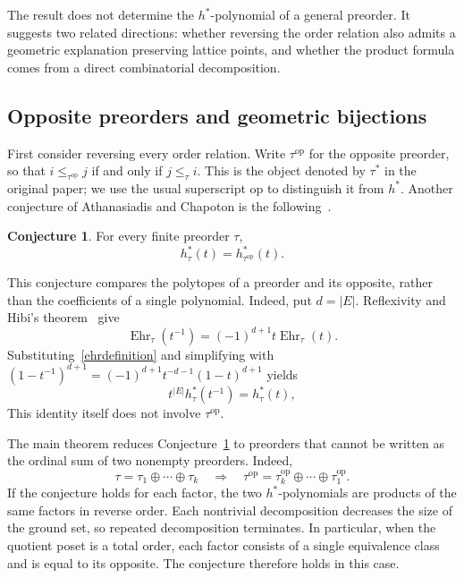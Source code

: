 \documentclass[11pt,reqno]{amsart}
\numberwithin{equation}{section}
\theoremstyle{definition}
\theoremstyle{remark}
\theoremstyle{definition}
\newtheorem{conjecture}[theorem]{Conjecture}
\DeclareMathOperator{\Ehr}{Ehr}
\begin{document}
The result does not determine the $h^*$-polynomial of a general preorder. It suggests two related directions: whether reversing the order relation also admits a geometric explanation preserving lattice points, and whether the product formula comes from a direct combinatorial decomposition.

\subsection{Opposite preorders and geometric bijections}
First consider reversing every order relation. Write $\tau^{\mathrm{op}}$ for the opposite preorder, so that $i\le_{\tau^{\mathrm{op}}}j$ if and only if $j\le_\tau i$. This is the object denoted by $\tau^*$ in the original paper; we use the usual superscript $\mathrm{op}$ to distinguish it from $h^*$. Another conjecture of Athanasiadis and Chapoton is the following~\cite[Conjecture~6.2]{AC}.
\begin{conjecture}\label{dualconjecture}
For every finite preorder $\tau$,
\[
 h_\tau^*(t)=h_{\tau^{\mathrm{op}}}^*(t).
\]
\end{conjecture}
This conjecture compares the polytopes of a preorder and its opposite, rather than the coefficients of a single polynomial. Indeed, put $d=|E|$. Reflexivity and Hibi's theorem~\cite[Theorem~2.1]{HIBI} give
\[
 \Ehr_\tau(t^{-1})=(-1)^{d+1}t\Ehr_\tau(t).
\]
Substituting~\eqref{ehrdefinition} and simplifying with $(1-t^{-1})^{d+1}=(-1)^{d+1}t^{-d-1}(1-t)^{d+1}$ yields
\[
 t^{|E|}h_\tau^*(t^{-1})=h_\tau^*(t),
\]
This identity itself does not involve $\tau^{\mathrm{op}}$.

The main theorem reduces Conjecture~\ref{dualconjecture} to preorders that cannot be written as the ordinal sum of two nonempty preorders. Indeed,
\[
 \tau=\tau_1\oplus\cdots\oplus\tau_k
 \quad\Longrightarrow\quad
 \tau^{\mathrm{op}}=\tau_k^{\mathrm{op}}\oplus\cdots\oplus\tau_1^{\mathrm{op}}.
\]
If the conjecture holds for each factor, the two $h^*$-polynomials are products of the same factors in reverse order. Each nontrivial decomposition decreases the size of the ground set, so repeated decomposition terminates. In particular, when the quotient poset is a total order, each factor consists of a single equivalence class and is equal to its opposite. The conjecture therefore holds in this case.
\end{document}

